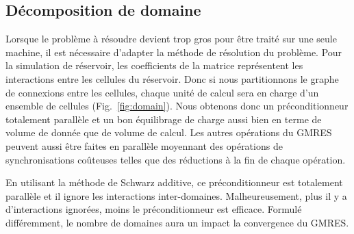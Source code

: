 \subsection{Décomposition de domaine}
Lorsque le problème à résoudre devient trop gros pour être traité sur une seule machine, il est nécessaire d'adapter la méthode de résolution du problème.
Pour la simulation de réservoir, les coefficients de la matrice représentent les interactions entre les cellules du réservoir.
%
Donc si nous partitionnons le graphe de connexions entre les cellules, chaque unité de calcul sera en charge d'un ensemble de cellules (Fig.~\ref{fig:domain}).
%
Nous obtenons donc un préconditionneur totalement parallèle et un bon équilibrage de charge aussi bien en terme de volume de donnée que de volume de calcul.
%
Les autres opérations du GMRES peuvent aussi être faites en parallèle moyennant des opérations de synchronisations coûteuses telles que des réductions à la fin de chaque opération.


En utilisant la méthode de Schwarz additive, ce préconditionneur est totalement parallèle et il ignore les interactions inter-domaines.
%
Malheureusement, plus il y a d'interactions ignorées, moins le préconditionneur est efficace.
%
Formulé différemment, le nombre de domaines aura un impact la convergence du GMRES.
